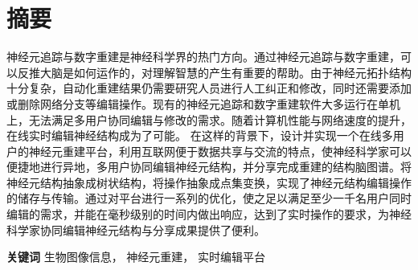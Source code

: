 \chapter{摘要}

神经元追踪与数字重建是神经科学界的热门方向。通过神经元追踪与数字重建，可以反推大脑是如何运作的，对理解智慧的产生有重要的帮助。由于神经元拓扑结构十分复杂，自动化重建结果仍需要研究人员进行人工纠正和修改，同时还需要添加或删除网络分支等编辑操作。现有的神经元追踪和数字重建软件大多运行在单机上，无法满足多用户协同编辑与修改的需求。随着计算机性能与网络速度的提升，在线实时编辑神经结构成为了可能。
在这样的背景下，设计并实现一个在线多用户的神经元重建平台，利用互联网便于数据共享与交流的特点，使神经科学家可以便捷地进行异地，多用户协同编辑神经元结构，并分享完成重建的结构脑图谱。将神经元结构抽象成树状结构，将操作抽象成点集变换，实现了神经元结构编辑操作的储存与传输。通过对平台进行一系列的优化，使之足以满足至少一千名用户同时编辑的需求，并能在毫秒级别的时间内做出响应，达到了实时操作的要求，为神经科学家协同编辑神经元结构与分享成果提供了便利。

{
    \vspace{1em}
    \setlength{\parindent}{0em}
    \textbf{关键词} \; 生物图像信息， \; 神经元重建， \; 实时编辑平台 \par
}